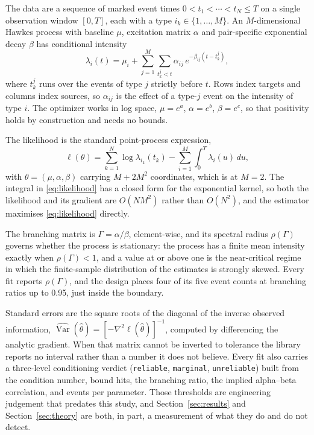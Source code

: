 The data are a sequence of marked event times $0 < t_1 < \cdots < t_N \le T$ on a
single observation window $[0, T]$, each with a type $i_k \in \{1, \ldots, M\}$. An
$M$-dimensional Hawkes process with baseline $\mu$, excitation matrix $\alpha$ and
pair-specific exponential decay $\beta$ has conditional intensity
\begin{equation}
\lambda_i(t) = \mu_i + \sum_{j=1}^{M}\sum_{t_k^j < t} \alpha_{ij}\,
e^{-\beta_{ij}(t - t_k^j)},
\end{equation}
where $t_k^j$ runs over the events of type $j$ strictly before $t$. Rows index
targets and columns index sources, so $\alpha_{ij}$ is the effect of a type-$j$
event on the intensity of type $i$. The optimizer works in log space,
$\mu = e^{a}$, $\alpha = e^{b}$, $\beta = e^{c}$, so that positivity holds by
construction and needs no bounds.

The likelihood is the standard point-process expression,
\begin{equation}
\ell(\theta) = \sum_{k=1}^{N} \log \lambda_{i_k}(t_k)
- \sum_{i=1}^{M} \int_0^T \lambda_i(u)\,du,
\label{eq:likelihood}
\end{equation}
with $\theta = (\mu, \alpha, \beta)$ carrying $M + 2M^2$ coordinates, which is
\ThParams{} at $M = 2$. The integral in \eqref{eq:likelihood} has a closed form for
the exponential kernel, so both the likelihood and its gradient are $O(NM^2)$
rather than $O(N^2)$, and the estimator maximises \eqref{eq:likelihood} directly.

The branching matrix is $\Gamma = \alpha/\beta$, element-wise, and its spectral
radius $\rho(\Gamma)$ governs whether the process is stationary: the process has a
finite mean intensity exactly when $\rho(\Gamma) < 1$, and a value at or above one
is the near-critical regime in which the finite-sample distribution of the
estimates is strongly skewed. Every fit reports $\rho(\Gamma)$, and the design
places four of its five event counts at branching ratios up to 0.95, just inside
the boundary.

Standard errors are the square roots of the diagonal of the inverse observed
information, $\widehat{\operatorname{Var}}(\hat\theta) = [-\nabla^2 \ell(\hat\theta)]^{-1}$,
computed by differencing the analytic gradient. When that matrix cannot be
inverted to tolerance the library reports no interval rather than a number it does
not believe. Every fit also carries a three-level conditioning verdict
(\texttt{reliable}, \texttt{marginal}, \texttt{unreliable}) built from the
condition number, bound hits, the branching ratio, the implied alpha--beta
correlation, and events per parameter. Those thresholds are engineering judgement
that predates this study, and Section~\ref{sec:results} and
Section~\ref{sec:theory} are both, in part, a measurement of what they do and do
not detect.
